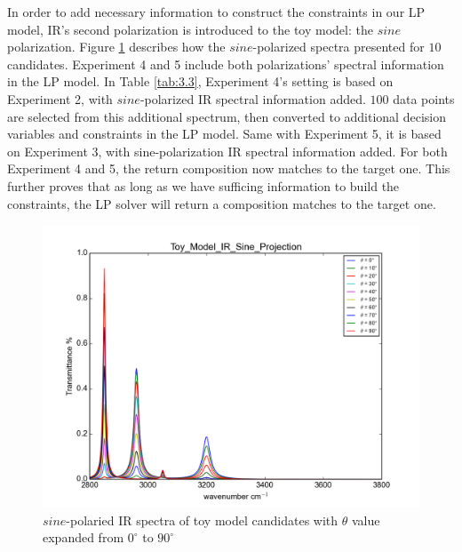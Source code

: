 
In order to add necessary information to construct the constraints in our LP model, IR's second polarization is introduced to the toy model: the $sine$ polarization. Figure \ref{fig:3.4} describes how the $sine$-polarized spectra presented for $10$ candidates. Experiment 4 and 5 include both polarizations' spectral information in the LP model. In Table \ref{tab:3.3}, Experiment 4's setting is based on Experiment 2, with $sine$-polarized IR spectral information added. $100$ data points are selected from this additional spectrum, then converted to additional decision variables and constraints in the LP model. Same with Experiment 5, it is based on Experiment 3, with sine-polarization IR spectral information added. For both Experiment 4 and 5, the return composition now matches to the target one. This further proves that as long as we have sufficing information to build the constraints, the LP solver will return a composition matches to the target one. \\ 

\begin{figure}[!ht]
\centering
\includegraphics[scale=0.7]{Figures/Toy_Model_IR_Sine_Projection.png} 
\caption{$sine$-polaried IR spectra of toy model candidates with $\theta$ value expanded from $0^{\circ}$ to $90^{\circ}$}  \label{fig:3.4}
\end{figure}

